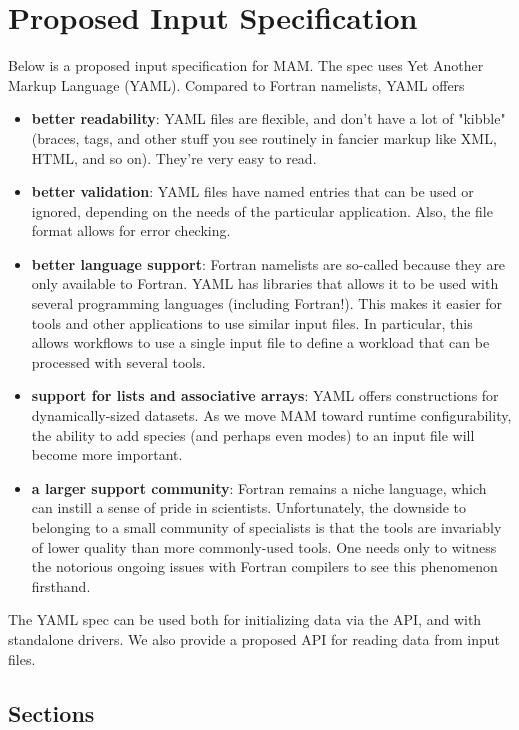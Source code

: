 \section{Proposed Input Specification}

Below is a proposed input specification for MAM. The spec uses Yet Another
Markup Language (YAML). Compared to Fortran namelists, YAML offers

\begin{itemize}
  \item {\bf better readability}: YAML files are flexible, and don't have a lot
    of "kibble" (braces, tags, and other stuff you see routinely in fancier
    markup like XML, HTML, and so on). They're very easy to read.
  \item {\bf better validation}: YAML files have named entries that can be
    used or ignored, depending on the needs of the particular application.
    Also, the file format allows for error checking.
  \item {\bf better language support}: Fortran namelists are so-called because
    they are only available to Fortran. YAML has libraries that allows it to
    be used with several programming languages (including Fortran!). This makes
    it easier for tools and other applications to use similar input files. In
    particular, this allows workflows to use a single input file to define a
    workload that can be processed with several tools.
  \item {\bf support for lists and associative arrays}: YAML offers
    constructions for dynamically-sized datasets. As we move MAM toward runtime
    configurability, the ability to add species (and perhaps even modes) to an
    input file will become more important.
  \item {\bf a larger support community}: Fortran remains a niche language,
    which can instill a sense of pride in scientists. Unfortunately, the
    downside to belonging to a small community of specialists is that the tools
    are invariably of lower quality than more commonly-used tools. One needs
    only to witness the notorious ongoing issues with Fortran compilers to see
    this phenomenon firsthand.
\end{itemize}

The YAML spec can be used both for initializing data via the API, and with
standalone drivers. We also provide a proposed API for reading data from
input files.

\subsection*{Sections}

